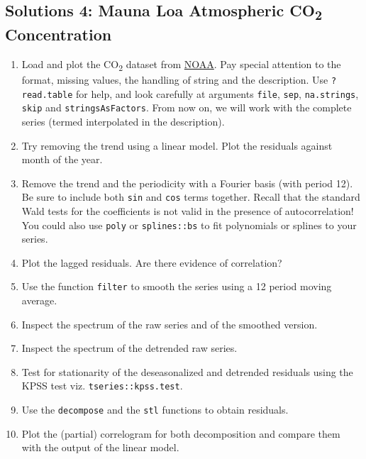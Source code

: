 \documentclass[]{book}
\providecommand{\tightlist}{%
  \setlength{\itemsep}{0pt}\setlength{\parskip}{0pt}}
\begin{document}
\subsection{\texorpdfstring{Solutions 4: Mauna Loa Atmospheric
CO\textsubscript{2}
Concentration}{Solutions 4: Mauna Loa Atmospheric CO2 Concentration}}\label{solutions-4-mauna-loa-atmospheric-co2-concentration}

\begin{enumerate}
\def\labelenumi{\arabic{enumi}.}
\tightlist
\item
  Load and plot the CO\textsubscript{2} dataset from
  \href{ftp://aftp.cmdl.noaa.gov/products/trends/co2/co2_mm_mlo.txt}{NOAA}.
  Pay special attention to the format, missing values, the handling of
  string and the description. Use \texttt{?read.table} for help, and
  look carefully at arguments \texttt{file}, \texttt{sep},
  \texttt{na.strings}, \texttt{skip} and \texttt{stringsAsFactors}. From
  now on, we will work with the complete series (termed interpolated in
  the description).
\item
  Try removing the trend using a linear model. Plot the residuals
  against month of the year.
\item
  Remove the trend and the periodicity with a Fourier basis (with period
  12). Be sure to include both \texttt{sin} and \texttt{cos} terms
  together. Recall that the standard Wald tests for the coefficients is
  not valid in the presence of autocorrelation! You could also use
  \texttt{poly} or \texttt{splines::bs} to fit polynomials or splines to
  your series.
\item
  Plot the lagged residuals. Are there evidence of correlation?
\item
  Use the function \texttt{filter} to smooth the series using a 12
  period moving average.
\item
  Inspect the spectrum of the raw series and of the smoothed version.
\item
  Inspect the spectrum of the detrended raw series.
\item
  Test for stationarity of the deseasonalized and detrended residuals
  using the KPSS test viz. \texttt{tseries::kpss.test}.
\item
  Use the \texttt{decompose} and the \texttt{stl} functions to obtain
  residuals.
\item
  Plot the (partial) correlogram for both decomposition and compare them
  with the output of the linear model.
\end{enumerate}
\end{document}
